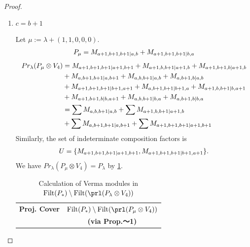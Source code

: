 \begin{proof}
\begin{enumerate}
\begin{enumerate}
        \item $c=b+1$ \par
        Let $\mu:=\lambda + (1,1,0,0,0) $.
        \begin{equation}\notag
          \begin{aligned}
            P_\mu = M_{a+1,b+1,b+1|a,b}
+ M_{a+1,b+1,b+1|b,a}
          \end{aligned}
        \end{equation}
        \begin{equation}\notag
          \begin{aligned}
            Pr_{\lambda}(P_\mu \otimes V_{4}) &=
M_{a+1,b+1,b+1|a+1,b+1}
+ M_{a+1,b,b+1|a+1,b}
+ M_{a+1,b+1,b|a+1,b}\\
                                              &
+ M_{a,b+1,b+1|a,b+1}
+ M_{a,b,b+1|a,b}
+ M_{a,b+1,b|a,b}\\
                                              &
+ M_{a+1,b+1,b+1|b+1,a+1}
+ M_{a,b+1,b+1|b+1,a}
+ M_{a+1,b,b+1|b,a+1}\\
                                              &
+ M_{a+1,b+1,b|b,a+1}
+ M_{a,b,b+1|b,a}
+ M_{a,b+1,b|b,a} \\
                                               &=
\sum M_{a,b,b+1|a,b}
+ \sum M_{a+1,b,b+1|a+1,b}\\
                                              &
+ \sum M_{a,b+1,b+1|a,b+1}
+ \sum M_{a+1,b+1,b+1|a+1,b+1}
          \end{aligned}
        \end{equation}
      Similarly, the set of indeterminate composition factors is 
\begin{equation}\notag
  \begin{aligned}
    U = \{
M_{a+1,b+1,b+1|a+1,b+1},
M_{a+1,b+1,b+1|b+1,a+1}
\}.
  \end{aligned}
\end{equation}
       We have $Pr_{\lambda}(P_\mu \otimes V_{4}) = P_\lambda  $ by \cref{tab:verma-analysis_c_6}.
\begin{table}[htbp]
\centering
\caption{Calculation of Verma modules in $\operatorname{Filt}(P_*) \setminus \operatorname{Filt}(\prl(P_\lambda \otimes V_{4})) $ } \label{tab:verma-analysis_c_6}
\begin{tabular}{cc}
\toprule
\textbf{Proj. Cover} & \textbf{$\operatorname{Filt}(P_*) \setminus \operatorname{Filt}(\prl(P_\mu \otimes V_{4})) $}  \\
     & \textbf{(via Prop.～1)}  \\

\end{tabular}
\end{table}
\end{enumerate}
\end{enumerate}
\end{proof}
